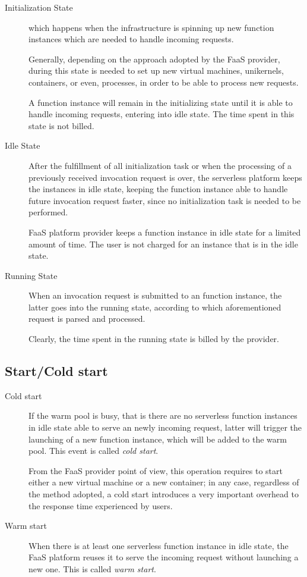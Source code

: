 \documentclass[12pt,a4paper]{report}
\theoremstyle{definition}
\begin{document}
\begin{description}
	
	\item[Initialization State] which happens when the infrastructure is spinning up new function instances which are needed to handle incoming requests. 
	
	Generally, depending on the approach adopted by the FaaS provider, during this state is needed to set up new virtual machines, unikernels, containers, or even, processes, in order to be able to process new requests.
	
	A function instance will remain in the initializing state until it is able to handle incoming requests, entering into idle state. The time spent in this state is not billed. 
	
	\item[Idle State] After the fulfillment of all initialization task or when the processing of a previously received invocation request is over, the serverless platform keeps the instances in idle state, keeping the function instance able to handle future invocation request faster, since no initialization task is needed to be performed.
	
	FaaS platform provider keeps a function instance in idle state for a limited amount of time. The user is not charged for an instance that is in the idle state.
	
	\item[Running State] When an invocation request is submitted to an function instance, the latter goes into the running state, according to which aforementioned request is parsed and processed.
	
	Clearly, the time spent in the running state is billed by the provider.
		
\end{description}

\subsection{Start/Cold start}

\begin{description}
	\item[Cold start] If the warm pool is busy, that is there are no serverless function instances in idle state able to serve an newly incoming request, latter will trigger the launching of a new function instance, which will be added to the warm pool. This event is called \textit{cold start}.
	
	From the FaaS provider point of view, this operation requires to start either a new virtual	machine or a new container; in any case, regardless of the method adopted, a cold start introduces a very important overhead to the response time experienced by users. 
	
	\item[Warm start] When there is at least one serverless function instance in idle state, the FaaS platform reuses it to serve the incoming request without launching a new one. This is called \textit{warm start}.
\end{description}  
\end{document}
